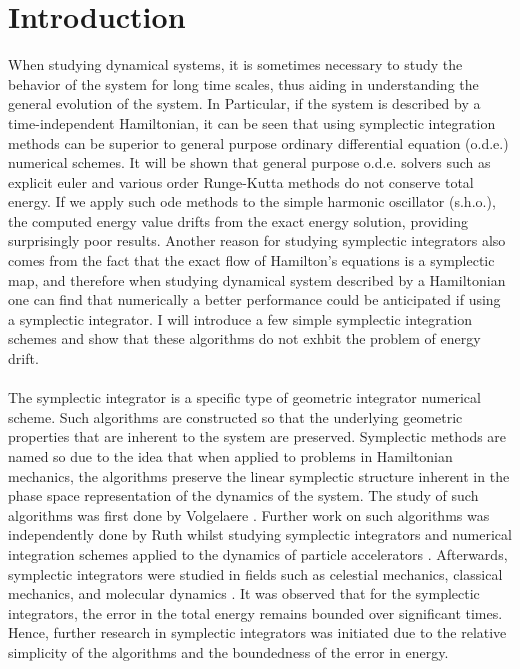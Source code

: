\documentclass[12pt]{article}
\begin{document}
\section{Introduction}
When studying dynamical systems, it is sometimes necessary to study the behavior of the system for long time scales, thus aiding in understanding the general evolution of the system. In Particular, if the system is described by a time-independent Hamiltonian, it can be seen that using symplectic integration methods can be superior to general purpose ordinary differential equation (o.d.e.) numerical schemes. It will be shown that general purpose o.d.e. solvers such as explicit euler and various order Runge-Kutta methods do not conserve total energy. If we apply such ode methods to the simple harmonic oscillator (s.h.o.), the computed energy value drifts from the exact energy solution, providing surprisingly poor results. Another reason for studying symplectic integrators also comes from the fact that the exact flow of Hamilton's equations is a symplectic map, and therefore when studying dynamical system described by a Hamiltonian one can find that numerically a better performance could be anticipated if using a symplectic integrator. I will introduce a few simple symplectic integration schemes and show that these algorithms do not exhbit the problem of energy drift.\\\\
\indent The symplectic integrator is a specific type of geometric integrator numerical scheme. Such algorithms are constructed so that the underlying geometric properties that are inherent to the system are preserved. Symplectic methods are named so due to the idea that when applied to problems in Hamiltonian mechanics, the algorithms preserve the linear symplectic structure inherent in the phase space representation of the dynamics of the system. The study of such algorithms was first done by Volgelaere \cite{RV}. Further work on such algorithms was independently done by Ruth whilst studying symplectic integrators and numerical integration schemes applied to the dynamics of particle accelerators \cite{RR}. Afterwards, symplectic integrators were studied in fields such as celestial mechanics, classical mechanics, and molecular dynamics \cite{MPS}. It was observed that for the symplectic integrators, the error in the total energy remains bounded over significant times. Hence, further research in symplectic integrators was initiated due to the relative simplicity of the algorithms and the boundedness of the error in energy.\\\\
\end{document}
